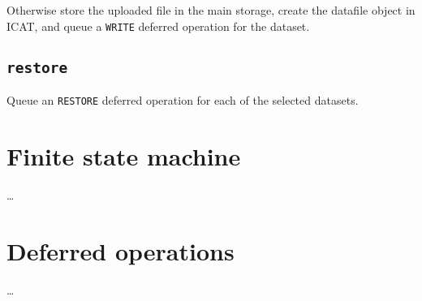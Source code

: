 \documentclass[paper=a4]{scrartcl}
\begin{document}
Otherwise store the uploaded file in the main storage, create the
datafile object in ICAT, and queue a \texttt{WRITE} deferred operation
for the dataset.

\subsection{\texttt{restore}}

Queue an \texttt{RESTORE} deferred operation for each of the selected
datasets.


\section{Finite state machine}
\label{sec:fsm}

\ldots


\section{Deferred operations}
\label{sec:defops}

\ldots
\end{document}
